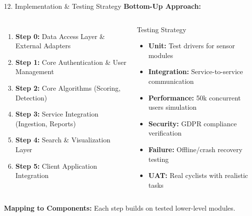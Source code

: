 \documentclass[aspectratio=169, 10pt]{beamer}
\begin{document}
\begin{frame}{12. Implementation \& Testing Strategy}
    \textbf{Bottom-Up Approach:}
    
    \vspace{0.3cm}
    \begin{columns}[T]
        \begin{enumerate}
            \item \textbf{Step 0:} Data Access Layer \& External Adapters
            \item \textbf{Step 1:} Core Authentication \& User Management
            \item \textbf{Step 2:} Core Algorithms (Scoring, Detection)
            \item \textbf{Step 3:} Service Integration (Ingestion, Reports)
            \item \textbf{Step 4:} Search \& Visualization Layer
            \item \textbf{Step 5:} Client Application Integration
        \end{enumerate}
        
        \begin{block}{Testing Strategy}
            \begin{itemize}
                \item \textbf{Unit:} Test drivers for sensor modules
                \item \textbf{Integration:} Service-to-service communication
                \item \textbf{Performance:} 50k concurrent users simulation
                \item \textbf{Security:} GDPR compliance verification
                \item \textbf{Failure:} Offline/crash recovery testing
                \item \textbf{UAT:} Real cyclists with realistic tasks
            \end{itemize}
        \end{block}
    \end{columns}
    
    \vspace{0.3cm}
    \textbf{Mapping to Components:} Each step builds on tested lower-level modules.
\end{frame}
\end{document}
